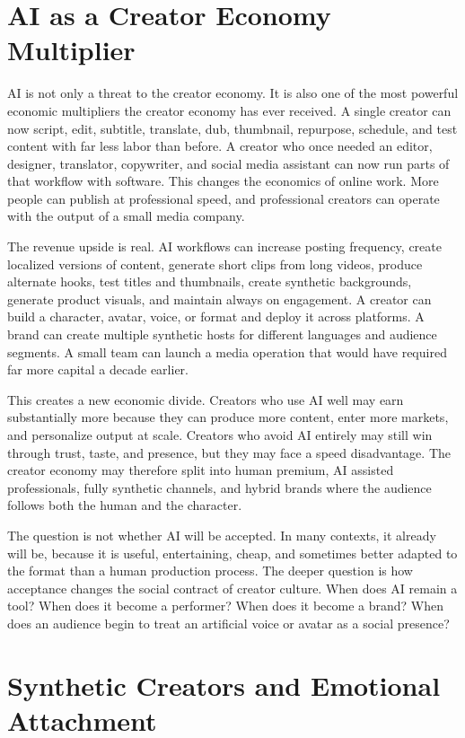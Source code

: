 \documentclass[11pt]{article}
\begin{document}
\section{AI as a Creator Economy Multiplier}

AI is not only a threat to the creator economy. It is also one of the most powerful economic multipliers the creator economy has ever received. A single creator can now script, edit, subtitle, translate, dub, thumbnail, repurpose, schedule, and test content with far less labor than before. A creator who once needed an editor, designer, translator, copywriter, and social media assistant can now run parts of that workflow with software. This changes the economics of online work. More people can publish at professional speed, and professional creators can operate with the output of a small media company.

The revenue upside is real. AI workflows can increase posting frequency, create localized versions of content, generate short clips from long videos, produce alternate hooks, test titles and thumbnails, create synthetic backgrounds, generate product visuals, and maintain always on engagement. A creator can build a character, avatar, voice, or format and deploy it across platforms. A brand can create multiple synthetic hosts for different languages and audience segments. A small team can launch a media operation that would have required far more capital a decade earlier.

This creates a new economic divide. Creators who use AI well may earn substantially more because they can produce more content, enter more markets, and personalize output at scale. Creators who avoid AI entirely may still win through trust, taste, and presence, but they may face a speed disadvantage. The creator economy may therefore split into human premium, AI assisted professionals, fully synthetic channels, and hybrid brands where the audience follows both the human and the character.

The question is not whether AI will be accepted. In many contexts, it already will be, because it is useful, entertaining, cheap, and sometimes better adapted to the format than a human production process. The deeper question is how acceptance changes the social contract of creator culture. When does AI remain a tool? When does it become a performer? When does it become a brand? When does an audience begin to treat an artificial voice or avatar as a social presence?

\section{Synthetic Creators and Emotional Attachment}
\end{document}
